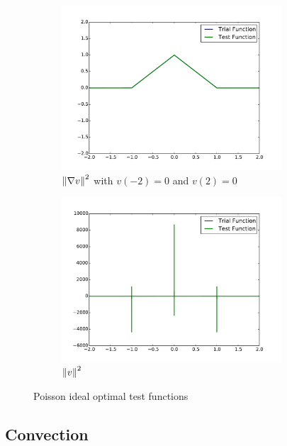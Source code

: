 \documentclass{article}
\begin{document}
\begin{figure}[ht]
\begin{subfigure}[t]{0.45\textwidth}
\centering
\includegraphics[width=0.9\textwidth]{OptimalTestFunctions/SpecialCases/PoissonGradBC.pdf}
\caption{$\left\| \nabla v \right\|^2$ with $v(-2)=0$ and  $v(2)=0$}
\end{subfigure}
\begin{subfigure}[t]{0.45\textwidth}
\centering
\includegraphics[width=0.9\textwidth]{OptimalTestFunctions/SpecialCases/PoissonL2NoBC.pdf}
\caption{$\left\| v \right\|^2$}
\end{subfigure}
\caption{Poisson ideal optimal test functions}
\end{figure}

\clearpage
\subsection*{Convection}
\end{document}
